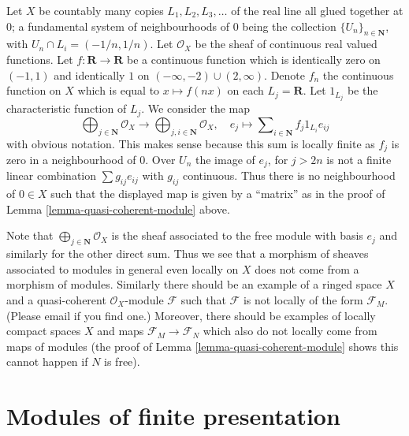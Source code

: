 \begin{example}
\label{example-quasi-coherent}
Let $X$ be countably many copies $L_1, L_2, L_3, \ldots$
of the real line all glued together at $0$; a fundamental
system of neighbourhoods of $0$ being the collection
$\{U_n\}_{n \in \mathbf{N}}$, with $U_n \cap L_i = (-1/n, 1/n)$.
Let $\mathcal{O}_X$ be the sheaf of continuous real valued functions.
Let $f : \mathbf{R} \to \mathbf{R}$ be a continuous function
which is identically zero on $(-1, 1)$ and identically $1$
on $(-\infty, -2) \cup (2, \infty)$. Denote $f_n$ the continuous
function on $X$ which is equal to $x \mapsto f(nx)$ on each
$L_j = \mathbf{R}$. Let $1_{L_j}$ be the characteristic function
of $L_j$. We consider the map
$$
\bigoplus\nolimits_{j \in \mathbf{N}}
\mathcal{O}_X
\longrightarrow
\bigoplus\nolimits_{j, i \in \mathbf{N}}
\mathcal{O}_X, \quad
e_j \longmapsto \sum\nolimits_{i \in \mathbf{N}} f_j 1_{L_i} e_{ij}
$$
with obvious notation. This makes sense because this sum is locally
finite as $f_j$ is zero in a neighbourhood of $0$. Over $U_n$
the image of $e_j$, for $j > 2n$ is not a finite linear combination
$\sum g_{ij} e_{ij}$ with $g_{ij}$ continuous. Thus there is
no neighbourhood of $0 \in X$ such that the displayed map is given by
a ``matrix'' as in the proof of Lemma \ref{lemma-quasi-coherent-module} above.

\medskip\noindent
Note that $\bigoplus\nolimits_{j \in \mathbf{N}} \mathcal{O}_X$
is the sheaf associated to the free module with basis $e_j$
and similarly for the other direct sum. Thus we see that a
morphism of sheaves associated to modules in general even
locally on $X$ does not come from a morphism of modules.
Similarly there should be an example of a ringed space $X$
and a quasi-coherent $\mathcal{O}_X$-module $\mathcal{F}$
such that $\mathcal{F}$ is not locally of the form $\mathcal{F}_M$.
(Please email if you find one.)
Moreover, there should be examples of locally compact spaces
$X$ and maps $\mathcal{F}_M \to \mathcal{F}_N$ which also do
not locally come from maps of modules (the proof of Lemma
\ref{lemma-quasi-coherent-module} shows this cannot happen
if $N$ is free).
\end{example}












\section{Modules of finite presentation}
\label{section-finite-presentation}


